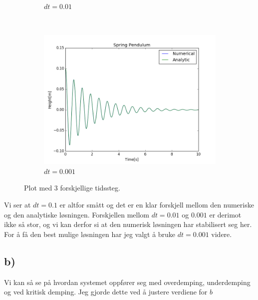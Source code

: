 \documentclass[a4paper,norsk, 10pt]{article}
\begin{document}
\begin{figure}[H]
\begin{subfigure}[b]{0.3\textwidth}
        \caption{$dt = 0.01$}
        \label{fig:dt001}
    \end{subfigure}
    ~ %
    \begin{subfigure}[b]{0.3\textwidth}
        \includegraphics[width=\textwidth]{dt0001.png}
        \caption{$dt = 0.001$}
        \label{fig:dt001}
    \end{subfigure}
    \caption{Plot med 3 forskjellige tidssteg.}\label{fig:dter}
\end{figure}

Vi ser at $dt = 0.1$ er altfor smått og det er en klar forskjell mellom den numeriske og den analytiske løsningen. Forskjellen mellom $dt = 0.01$ og $0.001$ er derimot ikke så stor, og vi kan derfor si at den numerisk løsningen har stabilisert seg her. For å få den best mulige løsningen har jeg valgt å bruke $dt = 0.001$ videre.

\subsection*{b)}

Vi kan så se på hvordan systemet oppfører seg med overdemping, underdemping og ved kritisk demping. Jeg gjorde dette ved å justere verdiene for $b$
\end{document}
